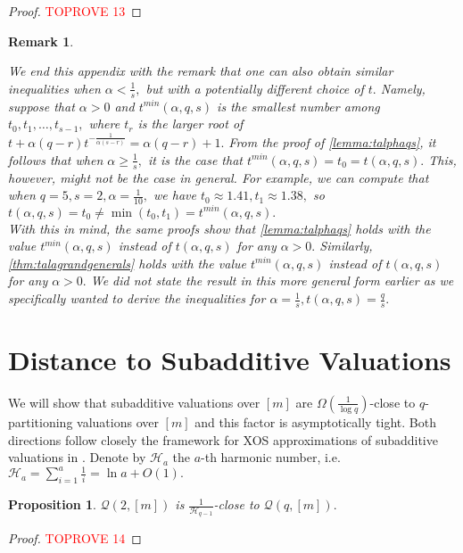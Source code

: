 \documentclass[11pt]{article}%
\newtheorem{remark}[theorem]{Remark}
\newtheorem{proposition}[theorem]{Proposition}
\numberwithin{theorem}{subsection}
\newcommand{\classqm}{\mathcal{Q}(q,[m])}
\begin{document}
\noindent
\begin{proof}\textcolor{red}{TOPROVE 13}\end{proof}

\begin{remark}
\label{rmk:alphalessthansiso}
\normalfont

We end this appendix with the remark that one can also obtain similar inequalities when $\alpha <\frac{1}{s},$ but with a potentially different choice of $t.$ Namely, suppose that $\alpha >0$ and $t^{min}(\alpha ,q,s)$ is the smallest number among $t_0,t_1,\ldots, t_{s-1},$ where $t_r$ is the larger root of\linebreak $t + \alpha (q-r)t^{-\frac{1}{\alpha (s-r)}} = \alpha (q-r)+1.$ From the proof of \cref{lemma:talphaqs}, it follows that 
when $\alpha \ge\frac{1}{s},$ it is the case that $t^{min}(\alpha ,q,s) =t_0 = t(\alpha, q, s).$ This, however, might not be the case in general. For example, we can compute that when $q = 5, s = 2, \alpha = \frac{1}{10},$
we have $t_0 \approx 1.41, t_1\approx 1.38,$ so $t(\alpha ,q,s) = t_0\neq \min(t_0,t_1) = t^{min}(\alpha,q,s).$\\
 
\noindent
With this in mind, the same proofs show that \cref{lemma:talphaqs} holds with the value $t^{min}(\alpha,q,s)$ instead of $t(\alpha,q,s)$ for any $\alpha >0.$ Similarly,
\cref{thm:talagrandgenerals} holds 
with the value $t^{min}(\alpha,q,s)$ instead of $t(\alpha,q,s)$ for any $\alpha >0.$ We did not state the result in this more general form earlier as we specifically wanted to derive the inequalities for $\alpha = \frac{1}{s}, t(\alpha,q,s) = \frac{q}{s}.$ 
\end{remark}
\section{Distance to Subadditive Valuations}
\label{section:closeness}
We will show that subadditive valuations over $[m]$ are $\Omega(\frac{1}{\log q})$-close to $q$-partitioning valuations over $[m]$ and this factor is asymptotically tight. Both directions follow closely the framework for XOS 
approximations of subadditive valuations in \cite{BhawalkarR11}. Denote by $\mathcal{H}_a$ the $a$-th harmonic number, i.e. $\displaystyle\mathcal{H}_a = \sum_{i = 1}^a\frac{1}{i} = \ln a + O(1).$

\noindent
\begin{proposition}
\label{lem:qparttosa}
 $\mathcal{Q}(2,[m])$ is $\frac{1}{\mathcal{H}_{q-1}}$-close to $\classqm.$
\end{proposition}
\begin{proof}\textcolor{red}{TOPROVE 14}\end{proof}
\end{document}
